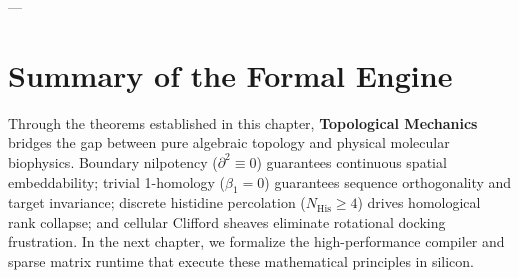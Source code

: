 ---

\section{Summary of the Formal Engine}
\label{sec:type_engine_summary}

Through the theorems established in this chapter, \textbf{Topological Mechanics} bridges the gap between pure algebraic topology and physical molecular biophysics. Boundary nilpotency ($\partial^2 \equiv 0$) guarantees continuous spatial embeddability; trivial 1-homology ($\beta_1 = 0$) guarantees sequence orthogonality and target invariance; discrete histidine percolation ($N_{\text{His}} \ge 4$) drives homological rank collapse; and cellular Clifford sheaves eliminate rotational docking frustration. In the next chapter, we formalize the high-performance compiler and sparse matrix runtime that execute these mathematical principles in silicon.
